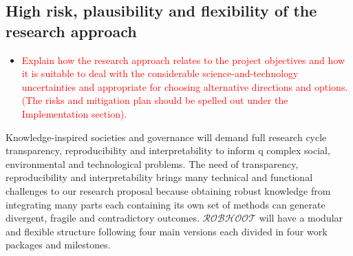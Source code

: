 \documentclass[11pt, a4paper]{article} %
\begin{document}

\subsection{High risk, plausibility and flexibility of the research approach}


\begin{itemize}
\item \textcolor{red}{Explain how the research approach relates to the
    project objectives and how it is suitable to deal with the
    considerable science-and-technology uncertainties and appropriate
    for choosing alternative directions and options. (The risks and
    mitigation plan should be spelled out under the Implementation
    section).}
\end{itemize}

Knowledge-inspired societies and governance will demand full research
cycle transparency, reproducibility and interpretability to inform q
complex social, environmental and technological problems. The need of
transparency, reproducibility and interpretability brings many
technical and functional challenges to our research proposal because
obtaining robust knowledge from integrating many parts each containing
its own set of methods can generate divergent, fragile and
contradictory outcomes. {\bf $\mathcal{ROBHOOT}$} will have a modular
and flexible structure following four main versions each divided in
four work packages and milestones.
\end{document}
